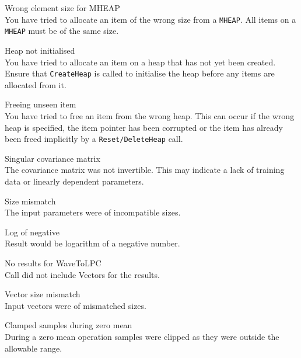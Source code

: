 \begin{itemize}
\begin{itemize}
    Wrong element size for MHEAP\\
        You have tried to allocate an item of the wrong size from a 
        \texttt{MHEAP}. All items on a \texttt{MHEAP} must be of the same size.

    Heap not initialised\\
        You have tried to allocate an item on a heap that has not yet been 
        created.  Ensure that \texttt{CreateHeap} is called to initialise 
        the heap before any items are allocated from it.

    Freeing unseen item\\
        You have tried to free an item from the wrong heap.  This can occur
        if the wrong heap is specified, the item pointer has been corrupted 
        or the item has already been freed implicitly by a 
        \texttt{Reset/DeleteHeap} call.  

\end{itemize}
 
 
\begin{itemize}
    Singular covariance matrix\\
        The covariance matrix was not invertible.  This may indicate a lack
        of training data or linearly dependent parameters.

    Size mismatch\\
        The input parameters were of incompatible sizes.

    Log of negative\\
        Result would be logarithm of a negative number.

\end{itemize}


\begin{itemize}
    No results for WaveToLPC\\
        Call did not include Vectors for the results.

    Vector size mismatch\\
        Input vectors were of mismatched sizes.

    Clamped samples during zero mean\\
        During a zero mean operation samples were clipped as they were outside
        the allowable range.

\end{itemize}


\end{itemize}

